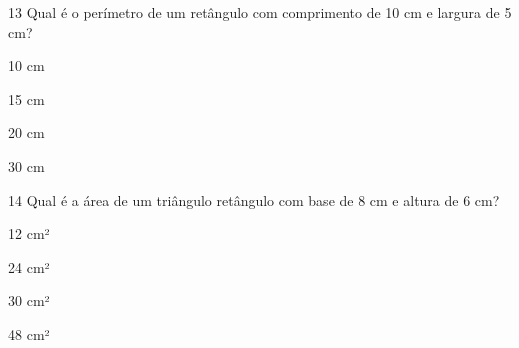 
\num{13} Qual é o perímetro de um retângulo com comprimento de 10 cm e
largura de 5 cm?

\begin{escolha}
\item 10 cm
\item 15 cm
\item 20 cm
\item 30 cm
\end{escolha}



\num{14} Qual é a área de um triângulo retângulo com base de 8 cm e altura de
6 cm?

\begin{escolha}
\item 12 cm²
\item 24 cm²
\item 30 cm²
\item 48 cm²
\end{escolha}


